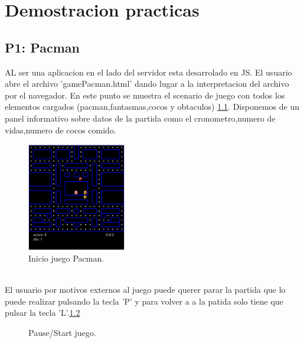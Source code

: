 
\chapter{Demostracion practicas} %

\label{Chapter5} %

\section{P1: Pacman}
AL ser una aplicacion en el lado del servidor esta desarrolado  en JS. El usuario  abre el archivo 'gamePacman.html' dando lugar a la interpretacion del archivo por el navegador. En este punto se muestra el scenario de juego con todos los elementos cargados (pacman,fantasmas,cocos y obtaculos) \ref{fig:InitGame}. Disponemos  de un panel informativo sobre datos de la partida como el cronometro,numero de vidas,numero de cocos comido.
\begin{figure}[!h]
\centering
\includegraphics[width=43mm]{Figures/InitGame}
\decoRule
\caption[Inicio Juego]{Inicio juego Pacman.}
\label{fig:InitGame}
\end{figure}
\\El usuario por motivos externos al juego puede querer parar la partida que lo puede realizar pulsando la tecla 'P' y para volver a a la patida solo tiene que pulsar la tecla 'L'.\ref{fig:Pause/Start game}
\begin{figure}[htbp]
\centering
{}\hspace{5mm}
\caption{Pause/Start juego.} \label{fig:Pause/Start game}
\end{figure}
